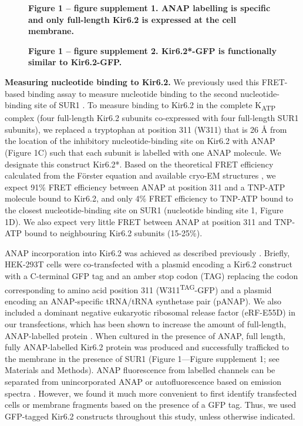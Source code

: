 \documentclass[9pt,lineno, onehalfspacing]{elife_modified}
\begin{document}
\begin{figure}
\begin{fullwidth}
\textbf{Figure 1 -- figure supplement 1. ANAP labelling is specific and only full-length Kir6.2 is expressed at the cell membrane.}

\textbf{Figure 1 -- figure supplement 2. Kir6.2*-GFP is functionally similar to Kir6.2-GFP.}
\end{fullwidth}
\end{figure}

\textbf{Measuring nucleotide binding to Kir6.2.}
We previously used this FRET-based binding assay to measure nucleotide binding to the second nucleotide-binding site of SUR1 \citep{RN80}.
To measure binding to Kir6.2 in the complete K\textsubscript{ATP} complex (four full-length Kir6.2 subunits co-expressed with four full-length SUR1 subunits), we replaced a tryptophan at position 311 (W311) that is 26 \si{\angstrom} from the location of the inhibitory nucleotide-binding site on Kir6.2 with ANAP (Figure 1C) such that each subunit is labelled with one ANAP molecule.
We designate this construct Kir6.2*.
Based on the theoretical FRET efficiency calculated from the Förster equation and available cryo-EM structures \citep{RN6, RN113}, we expect 91\% FRET efficiency between ANAP at position 311 and a TNP-ATP molecule bound to Kir6.2, and only 4\% FRET efficiency to TNP-ATP bound to the closest nucleotide-binding site on SUR1 (nucleotide binding site 1, Figure 1D).
We also expect very little FRET between ANAP at position 311 and TNP-ATP bound to neighbouring Kir6.2 subunits (15-25\%).

ANAP incorporation into Kir6.2 was achieved as described previously \citep{RN17, RN22, RN80}.
Briefly, HEK-293T cells were co-transfected with a plasmid encoding a Kir6.2 construct with a C-terminal GFP tag and an amber stop codon (TAG) replacing the codon corresponding to amino acid position 311 (W311\textsuperscript{TAG}-GFP) and a plasmid encoding an ANAP-specific tRNA/tRNA synthetase pair (pANAP).
We also included a dominant negative eukaryotic ribosomal release factor (eRF-E55D) in our transfections, which has been shown to increase the amount of full-length, ANAP-labelled protein \citep{RN42, RN80}.
When cultured in the presence of ANAP, full length, fully ANAP-labelled Kir6.2 protein was produced and successfully trafficked to the membrane in the presence of SUR1 (Figure 1—Figure supplement 1; see Materials and Methods).
ANAP fluorescence from labelled channels can be separated from unincorporated ANAP or autofluorescence based on emission spectra \citep{RN80}.
However, we found it much more convenient to first identify transfected cells or membrane fragments based on the presence of a GFP tag.
Thus, we used GFP-tagged Kir6.2 constructs throughout this study, unless otherwise indicated.
\end{document}
